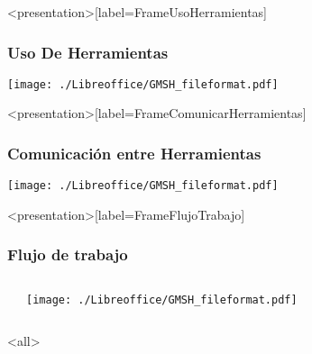 \mode*
\begin{frame}<presentation>[label=FrameUsoHerramientas]
  \frametitle{Uso De Herramientas}
  \texttt{[image: ./Libreoffice/GMSH\_fileformat.pdf]}
\end{frame}

\begin{frame}<presentation>[label=FrameComunicarHerramientas]
  \frametitle{Comunicación entre Herramientas}
  \texttt{[image: ./Libreoffice/GMSH\_fileformat.pdf]}
\end{frame}

\begin{frame}<presentation>[label=FrameFlujoTrabajo]
  \frametitle{Flujo de trabajo}
  \begin{columns}
    \begin{codeblock}
      
    \end{codeblock}
    \texttt{[image: ./Libreoffice/GMSH\_fileformat.pdf]}
    \begin{codeblock}
      
    \end{codeblock}
  \end{columns}


\end{frame}
\mode<all>
